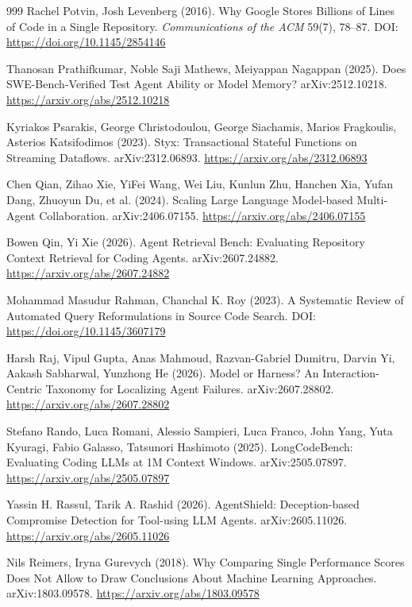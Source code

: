 \begin{thebibliography}{999}
 Rachel Potvin, Josh Levenberg (2016). Why Google Stores Billions of Lines of Code in a Single Repository. \emph{Communications of the ACM} 59(7), 78--87. DOI: \url{https://doi.org/10.1145/2854146}

 Thanosan Prathifkumar, Noble Saji Mathews, Meiyappan Nagappan (2025). Does SWE-Bench-Verified Test Agent Ability or Model Memory? arXiv:2512.10218. \url{https://arxiv.org/abs/2512.10218}

 Kyriakos Psarakis, George Christodoulou, George Siachamis, Marios Fragkoulis, Asterios Katsifodimos (2023). Styx: Transactional Stateful Functions on Streaming Dataflows. arXiv:2312.06893. \url{https://arxiv.org/abs/2312.06893}

 Chen Qian, Zihao Xie, YiFei Wang, Wei Liu, Kunlun Zhu, Hanchen Xia, Yufan Dang, Zhuoyun Du, et al. (2024). Scaling Large Language Model-based Multi-Agent Collaboration. arXiv:2406.07155. \url{https://arxiv.org/abs/2406.07155}

 Bowen Qin, Yi Xie (2026). Agent Retrieval Bench: Evaluating Repository Context Retrieval for Coding Agents. arXiv:2607.24882. \url{https://arxiv.org/abs/2607.24882}

 Mohammad Masudur Rahman, Chanchal K. Roy (2023). A Systematic Review of Automated Query Reformulations in Source Code Search. DOI: \url{https://doi.org/10.1145/3607179}

 Harsh Raj, Vipul Gupta, Anas Mahmoud, Razvan-Gabriel Dumitru, Darvin Yi, Aakash Sabharwal, Yunzhong He (2026). Model or Harness? An Interaction-Centric Taxonomy for Localizing Agent Failures. arXiv:2607.28802. \url{https://arxiv.org/abs/2607.28802}

 Stefano Rando, Luca Romani, Alessio Sampieri, Luca Franco, John Yang, Yuta Kyuragi, Fabio Galasso, Tatsunori Hashimoto (2025). LongCodeBench: Evaluating Coding LLMs at 1M Context Windows. arXiv:2505.07897. \url{https://arxiv.org/abs/2505.07897}

 Yassin H. Rassul, Tarik A. Rashid (2026). AgentShield: Deception-based Compromise Detection for Tool-using LLM Agents. arXiv:2605.11026. \url{https://arxiv.org/abs/2605.11026}

 Nils Reimers, Iryna Gurevych (2018). Why Comparing Single Performance Scores Does Not Allow to Draw Conclusions About Machine Learning Approaches. arXiv:1803.09578. \url{https://arxiv.org/abs/1803.09578}


\end{thebibliography}
